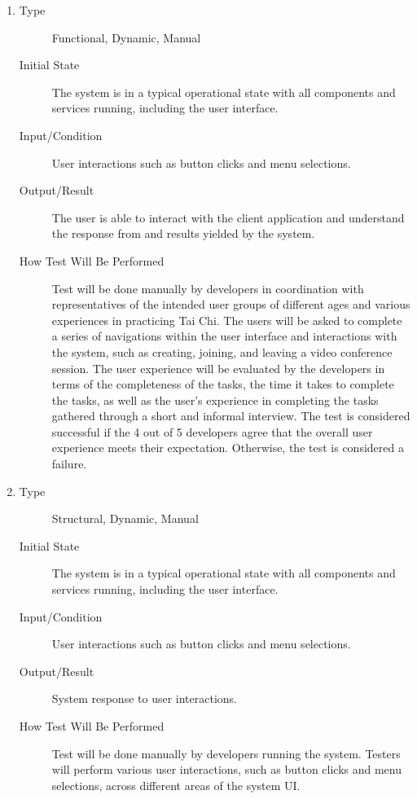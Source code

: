 \documentclass[12pt, titlepage]{article}
\begin{document}
\begin{enumerate}[NFR-T1]
\item \label{NFRT1}
  \begin{description}
  \item[Type] Functional, Dynamic, Manual
  \item[Initial State] The system is in a typical operational state with all
    components and services running, including the user interface.
  \item[Input/Condition] User interactions such as button clicks and menu
    selections.
  \item[Output/Result] The user is able to interact with the client application and
    understand the response from and results yielded by the system.
  \item[How Test Will Be Performed] Test will be done manually by developers in
    coordination with representatives of the intended user groups of different
    ages and various experiences in practicing Tai Chi. The users will be asked
    to complete a series of navigations within the user interface and
    interactions with the system, such as creating, joining, and leaving a video
    conference session. The user experience will be evaluated by the developers
    in terms of the completeness of the tasks, the time it takes to complete the
    tasks, as well as the user’s experience in completing the tasks gathered
    through a short and informal interview. The test is considered successful if
    the 4 out of 5 developers agree that the overall user experience meets their
    expectation. Otherwise, the test is considered a failure.
  \end{description}
\item \label{NFRT2}
  \begin{description}
  \item[Type] Structural, Dynamic, Manual
  \item[Initial State] The system is in a typical operational state with all
    components and services running, including the user interface.
  \item[Input/Condition] User interactions such as button clicks and menu
    selections.
  \item[Output/Result] System response to user interactions.
  \item[How Test Will Be Performed] Test will be done manually by developers
    running the system. Testers will perform various user interactions, such as
    button clicks and menu selections, across different areas of the system UI.

\end{description}
\end{enumerate}
\end{document}
